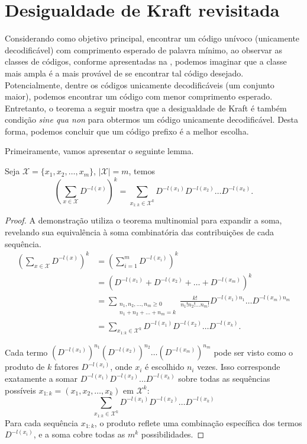 \section{Desigualdade de Kraft revisitada}
Considerando como objetivo principal, encontrar um código unívoco (unicamente decodificável)
com comprimento esperado de palavra mínimo, ao observar as classes de códigos, conforme
apresentadas na , podemos imaginar que a classe mais ampla é a mais
provável de se encontrar tal código desejado. Potencialmente, dentre os códigos
unicamente decodificáveis (um conjunto maior), podemos encontrar um código com menor comprimento esperado.
Entretanto, o teorema a seguir mostra que a desigualdade de Kraft é também
condição \emph{sine qua non} para obtermos um código unicamente
decodificável. Desta forma, podemos concluir que um código prefixo é a melhor escolha.

Primeiramente, vamos apresentar o seguinte lemma.
\begin{lemma}\label{lm:expmultin}
  Seja $\mathcal{X} = \{x_1, x_2, \ldots, x_m \}$, $\vert \mathcal{X} \vert = m$, temos
  \begin{equation}
    \left( \sum_{x \in \mathcal{X}} D^{-l(x)} \right)^k = \sum_{x_{1:k} \in \mathcal{X}^k} D^{-l(x_1)} D^{-l(x_2)} \ldots D^{-l(x_k)} .
  \end{equation}
\end{lemma}
\begin{proof}
  A demonstração utiliza o teorema multinomial para expandir a soma, revelando sua equivalência à soma combinatória das contribuições de cada sequência.
  \begin{subequations}
    \begin{align}
    \left( \sum_{x \in \mathcal{X}} D^{-l(x)} \right)^k &= \left( \sum_{i=1}^{m} D^{-l(x_i)} \right)^k \\
        &= \left( D^{-l(x_1)} + D^{-l(x_2)} + \ldots + D^{-l(x_m)}  \right)^k \nonumber \\
        &= \sum_{\substack{ n_1, n_2, \ldots, n_m \geq 0 \\ n_1 + n_2 + \ldots + n_m = k}} \frac{k!}{n_1! n_2! \ldots n_m!} D^{-l(x_1)n_1} \ldots D^{-l(x_m)n_m} \\
        &= \sum_{x_{1:k} \in \mathcal{X}^k} D^{-l(x_1)} D^{-l(x_2)} \ldots D^{-l(x_k)} .
    \end{align}
  \end{subequations}

  Cada termo $(D^{-l(x_1)})^{n_1} (D^{-l(x_2)})^{n_2} \ldots (D^{-l(x_m)})^{n_m}$ 
  pode ser visto como o produto de $k$ fatores $D^{-l(x_i)}$, onde $x_i$ é escolhido $n_i$ vezes. 
  Isso corresponde exatamente a somar $D^{-l(x_1)} D^{-l(x_2)} \ldots D^{-l(x_k)}$ 
  sobre todas as sequências possíveis $x_{1:k} = (x_1, x_2, \ldots, x_k)$ em $\mathcal{X}^k$:
  \[
  \sum_{x_{1:k} \in \mathcal{X}^k} D^{-l(x_1)} D^{-l(x_2)} \ldots D^{-l(x_k)}
  \]
  Para cada sequência $x_{1:k}$, o produto reflete uma combinação específica dos termos $D^{-l(x_i)}$, e a soma cobre todas as $m^k$ possibilidades.
\end{proof}


